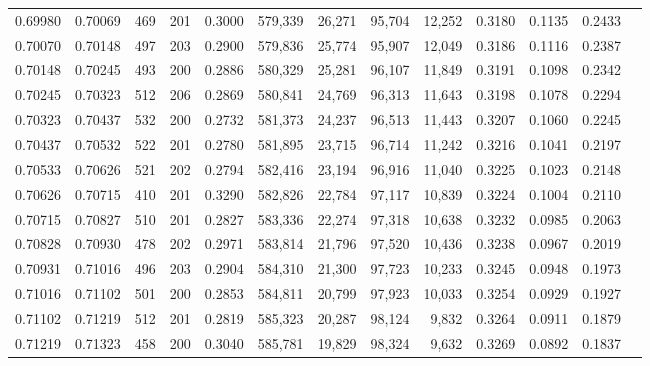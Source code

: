 \begin{tabular}{rrrrrrrrrrrrr}
0.69980 & 0.70069 &   469 & 201 &                                     0.3000 & 579,339 &  26,271 &  95,704 &  12,252 & 0.3180 & 0.1135 & 0.2433 \\
0.70070 & 0.70148 &   497 & 203 &                                     0.2900 & 579,836 &  25,774 &  95,907 &  12,049 & 0.3186 & 0.1116 & 0.2387 \\
0.70148 & 0.70245 &   493 & 200 &                                     0.2886 & 580,329 &  25,281 &  96,107 &  11,849 & 0.3191 & 0.1098 & 0.2342 \\
0.70245 & 0.70323 &   512 & 206 &                                     0.2869 & 580,841 &  24,769 &  96,313 &  11,643 & 0.3198 & 0.1078 & 0.2294 \\
0.70323 & 0.70437 &   532 & 200 &                                     0.2732 & 581,373 &  24,237 &  96,513 &  11,443 & 0.3207 & 0.1060 & 0.2245 \\
0.70437 & 0.70532 &   522 & 201 &                                     0.2780 & 581,895 &  23,715 &  96,714 &  11,242 & 0.3216 & 0.1041 & 0.2197 \\
0.70533 & 0.70626 &   521 & 202 &                                     0.2794 & 582,416 &  23,194 &  96,916 &  11,040 & 0.3225 & 0.1023 & 0.2148 \\
0.70626 & 0.70715 &   410 & 201 &                                     0.3290 & 582,826 &  22,784 &  97,117 &  10,839 & 0.3224 & 0.1004 & 0.2110 \\
0.70715 & 0.70827 &   510 & 201 &                                     0.2827 & 583,336 &  22,274 &  97,318 &  10,638 & 0.3232 & 0.0985 & 0.2063 \\
0.70828 & 0.70930 &   478 & 202 &                                     0.2971 & 583,814 &  21,796 &  97,520 &  10,436 & 0.3238 & 0.0967 & 0.2019 \\
0.70931 & 0.71016 &   496 & 203 &                                     0.2904 & 584,310 &  21,300 &  97,723 &  10,233 & 0.3245 & 0.0948 & 0.1973 \\
0.71016 & 0.71102 &   501 & 200 &                                     0.2853 & 584,811 &  20,799 &  97,923 &  10,033 & 0.3254 & 0.0929 & 0.1927 \\
0.71102 & 0.71219 &   512 & 201 &                                     0.2819 & 585,323 &  20,287 &  98,124 &   9,832 & 0.3264 & 0.0911 & 0.1879 \\
0.71219 & 0.71323 &   458 & 200 &                                     0.3040 & 585,781 &  19,829 &  98,324 &   9,632 & 0.3269 & 0.0892 & 0.1837 \\

\end{tabular}

